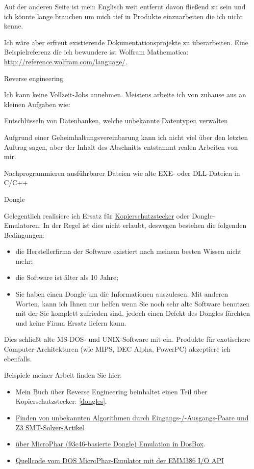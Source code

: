 Auf der anderen Seite ist mein Englisch weit entfernt davon fließend zu sein und
ich könnte lange brauchen um mich tief in Produkte einzuarbeiten die ich nicht kenne.

Ich wäre aber erfreut existierende Dokumentationsprojekte zu überarbeiten.
Eine Beispielreferenz die ich bewundere ist Wolfram Mathematica: \url{http://reference.wolfram.com/language/}.
\fi

\Large Reverse engineering \normalsize

Ich kann keine Vollzeit-Jobs annehmen. Meistens arbeite ich von zuhause aus an kleinen Aufgaben wie:

\large Entschlüsseln von Datenbanken, welche unbekannte Datentypen verwalten \normalsize

Aufgrund einer Geheimhaltungsvereinbarung kann ich nicht viel über den letzten Auftrag
sagen, aber der Inhalt des Abschnitts  entstammt realen Arbeiten von mir.

\large Nachprogrammieren ausführbarer Dateien wie alte EXE- oder DLL-Dateien in C/C++ \normalsize

\large Dongle \normalsize

Gelegentlich realisiere ich Ersatz für
\href{https://en.wikipedia.org/wiki/Software_protection_dongle}{Kopierschutzstecker} oder Dongle-Emulatoren.
In der Regel ist dies nicht erlaubt, deswegen bestehen die folgenden Bedingungen:

\begin{itemize}
\item die Herstellerfirma der Software existiert nach meinem besten Wissen nicht mehr;
\item die Software ist älter als 10 Jahre;
\item Sie haben einen Dongle um die Informationen auszulesen. Mit anderen Worten, kann ich Ihnen
nur helfen wenn Sie noch sehr alte Software benutzen mit der Sie komplett zufrieden sind, jedoch
einen Defekt des Dongles fürchten und keine Firma Ersatz liefern kann.
\end{itemize}

Dies schließt alte MS-DOS- und UNIX-Software mit ein. Produkte für exotischere Computer-Architekturen
(wie MIPS, DEC Alpha, PowerPC) akzeptiere ich ebenfalls.

Beispiele meiner Arbeit finden Sie hier:

\begin{itemize}
\item Mein Buch über Reverse Engineering beinhaltet einen Teil über Kopierschutzstecker: \ref{dongles}.
\item \href{http://yurichev.com/writings/z3_rockey.pdf}{Finden von unbekannten Algorithmen durch Eingangs-/-Ausgangs-Paare
und Z3 SMT-Solver-Artikel}
\item \href{http://yurichev.com/blog/56/}{über MicroPhar (93c46-basierte Dongle) Emulation in DosBox}.
\item \href{http://conus.info/dongle/src/microph.asm}{Quellcode vom DOS MicroPhar-Emulator mit der EMM386 I/O API}
\end{itemize}

